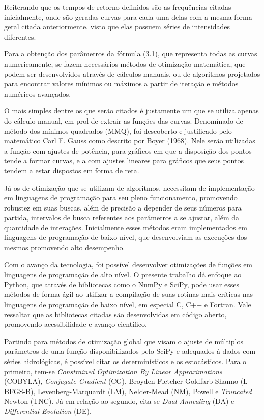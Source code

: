 \newpage

Reiterando que os tempos de retorno definidos são as frequências citadas inicialmente, onde são geradas curvas para cada uma delas com a mesma forma geral citada anteriormente, visto que elas possuem séries de intensidades diferentes.

Para a obtenção dos parâmetros da fórmula (3.1), que representa todas as curvas numericamente, se fazem necessários métodos de otimização matemática, que podem ser desenvolvidos através de cálculos manuais, ou de algoritmos projetados para encontrar valores mínimos ou máximos a partir de iteração e métodos numéricos avançados.

O mais simples dentre os que serão citados é justamente um que se utiliza apenas do cálculo manual, em prol de extrair as funções das curvas. Denominado de método dos mínimos quadrados (MMQ), foi descoberto e justificado pelo matemático Carl F. Gauss como descrito por Boyer (1968). Nele serão utilizadas a função com ajustes de potência, para gráficos em que a disposição dos pontos tende a formar curvas, e a com ajustes lineares para gráficos que seus pontos tendem a estar dispostos em forma de reta.

Já os de otimização que se utilizam de algoritmos, necessitam de implementação em linguagens de programação para seu pleno funcionamento, promovendo robustez em suas buscas, além de precisão a depender de seus números para partida, intervalos de busca referentes aos parâmetros a se ajustar, além da quantidade de interações. Inicialmente esses métodos eram implementados em linguagens de programação de baixo nível, que desenvolviam as execuções dos mesmos promovendo alto desempenho. 

Com o avanço da tecnologia, foi possível desenvolver otimizações de funções em linguagens de programação de alto nível. O presente trabalho dá enfoque ao Python, que através de bibliotecas como o NumPy e SciPy, pode usar esses métodos de forma ágil ao utilizar a compilação de suas rotinas mais críticas nas linguagens de programação de baixo nível, em especial C, C++ e Fortran. Vale ressaltar que as bibliotecas citadas são desenvolvidas em código aberto, promovendo acessibilidade e avanço científico. 

Partindo para métodos de otimização global que visam o ajuste de múltiplos parâmetros de uma função disponibilizados pelo SciPy e adequados à dados com séries hidrológicas, é possível citar os determinísticos e os estocásticos. Para o primeiro, tem-se \textit{Constrained Optimization By Linear Approximations} (COBYLA), \textit{Conjugate Gradient} (CG), Broyden-Fletcher-Goldfarb-Shanno (L-BFGS-B), Levenberg-Marquardt (LM), Nelder-Mead (NM), Powell e \textit{Truncated} Newton (TNC). Já em relação ao segundo, cita-se \textit{Dual-Annealing} (DA) e \textit{Differential Evolution} (DE).

